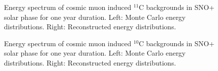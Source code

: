 \begin{figure}[htbp]
	\caption{Energy spectrum of cosmic muon induced $^{11}$C backgrounds in SNO+ solar phase for one year duration. Left: Monte Carlo energy distributions. Right: Reconstructed energy distributions.}
	\label{muonSolarC11}
\end{figure}

\begin{figure}[htbp]
	\caption{Energy spectrum of cosmic muon induced $^{10}$C backgrounds in SNO+ solar phase for one year duration. Left: Monte Carlo energy distributions. Right: Reconstructed energy distributions.}
	\label{muonSolarC10}
\end{figure}

